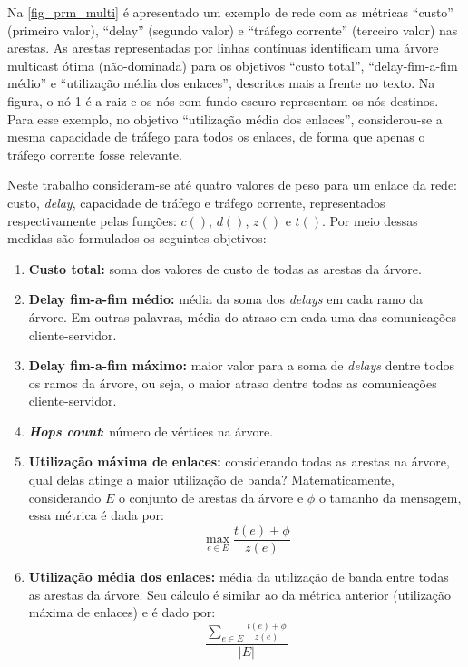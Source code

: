 Na \autoref{fig_prm_multi} é apresentado um exemplo de rede com as métricas ``custo'' (primeiro valor), ``delay'' (segundo valor) e ``tráfego corrente'' (terceiro valor) nas arestas. As arestas representadas por linhas contínuas identificam uma árvore multicast ótima (não-dominada) para os objetivos ``custo total'', ``delay-fim-a-fim médio'' e ``utilização média dos enlaces'', descritos mais a frente no texto. Na figura, o nó 1 é a raiz e os nós com fundo escuro representam os nós destinos. Para esse exemplo, no objetivo ``utilização média dos enlaces'', considerou-se a mesma capacidade de tráfego para todos os enlaces, de forma que apenas o tráfego corrente fosse relevante.

Neste trabalho consideram-se até quatro valores de peso para um enlace da rede: custo, \textit{delay}, capacidade de tráfego e tráfego corrente, representados respectivamente pelas funções: $c()$, $d()$, $z()$ e $t()$. Por meio dessas medidas são formulados os seguintes objetivos:

\begin{enumerate} 
	\item \textbf{Custo total:} soma dos valores de custo de todas as arestas da árvore.
	\item \textbf{Delay fim-a-fim médio:} média da soma dos \textit{delays} em cada ramo da árvore. Em outras palavras, média do atraso em cada uma das comunicações cliente-servidor.
	\item \textbf{Delay fim-a-fim máximo:} maior valor para a soma de \textit{delays} dentre todos os ramos da árvore, ou seja, o maior atraso dentre todas as comunicações cliente-servidor.
	\item \textbf{\textit{Hops count}}: número de vértices na árvore.
	\item \textbf{Utilização máxima de enlaces:} considerando todas as arestas na árvore, qual delas atinge a maior utilização de banda? Matematicamente, considerando $E$ o conjunto de arestas da árvore e $\phi$ o tamanho da mensagem, essa métrica é dada por:
	\begin{equation}\max_{e \in E} \frac{t(e) + \phi}{z(e)}\end{equation}
	\item \textbf{Utilização média dos enlaces:} média da utilização de banda entre todas as arestas da árvore. Seu cálculo é similar ao da métrica anterior (utilização máxima de enlaces) e é dado por:
	\begin{equation}\frac{\sum_{e \in E} \frac{t(e) + \phi}{z(e)}}{|E|}\end{equation}
\end{enumerate}

